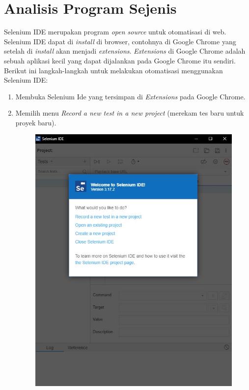 \section{Analisis Program Sejenis}
\label{sec:seleniumIDE}  
Selenium IDE merupakan program \textit{open source} untuk otomatisasi di web. Selenium IDE dapat di \textit{install} di browser, contohnya di Google Chrome yang setelah di \textit{install} akan menjadi \textit{extensions}. \textit{Extensions} di Google Chrome adalah sebuah aplikasi kecil yang dapat dijalankan pada Google Chrome itu sendiri. Berikut ini langkah-langkah untuk melakukan otomatisasi menggunakan Selenium IDE:
	\begin{enumerate}
		\item Membuka Selenium Ide yang tersimpan di \textit{Extensions} pada Google Chrome.
		\item Memilih menu \textit{Record a new test in a new project} (merekam tes baru untuk proyek baru).
		\begin{figure}[H]
			\centering
			\includegraphics[scale=0.4]{Gambar/menuSeleniumIDE.jpg}

\end{figure}
\end{enumerate}
